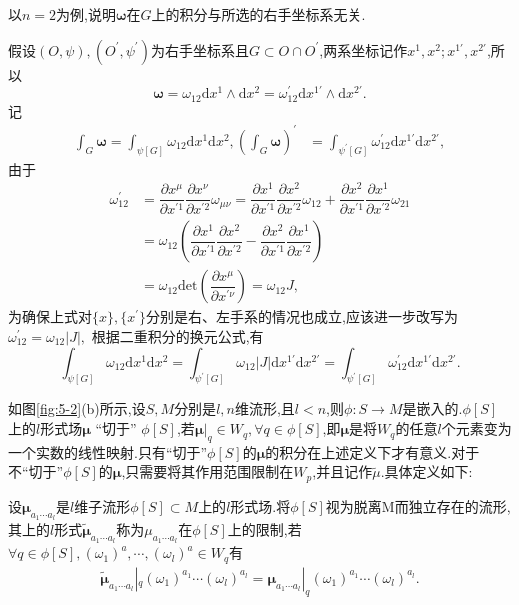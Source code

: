\begin{remark}
以$n=2$为例,说明$\boldsymbol{\omega}$在$G$上的积分与所选的右手坐标系无关.

假设$(O,\psi),(O^\prime,\psi^\prime)$为右手坐标系且$G\subset O\cap O^\prime$,两系坐标记作$x^1,x^2;x^{1\prime},x^{2\prime}$,所以
$$\boldsymbol{\omega}=\omega_{12}\mathrm{d}x^1\wedge \mathrm{d}x^2=\omega_{12}^\prime\mathrm{d}x^{1\prime}\wedge \mathrm{d}x^{2\prime}.
$$
记
$$
\begin{aligned}
\int_G \boldsymbol{\omega}=\int_{\psi{[G]}}\omega_{12} \mathrm{d}x^1\mathrm{d}x^2,\left(\int_G \boldsymbol{\omega}\right)^\prime &=\int_{\psi^\prime{[G]}}\omega_{12}^\prime \mathrm{d}x^{1\prime}\mathrm{d}x^{2\prime},
\end{aligned}
$$
由于
$$
\begin{aligned}
\omega_{12}^\prime&=\dfrac{\partial x^\mu}{\partial x^{\prime 1}}\dfrac{\partial x^\nu}{\partial x^{\prime2}}\omega_{\mu\nu}=\dfrac{\partial x^1}{\partial x^{\prime 1}}\dfrac{\partial x^2}{\partial x^{\prime2}}\omega_{12}+\dfrac{\partial x^2}{\partial x^{\prime 1}}\dfrac{\partial x^1}{\partial x^{\prime2}}\omega_{21}\\
&=\omega_{12}\left(\dfrac{\partial x^1}{\partial x^{\prime 1}}\dfrac{\partial x^2}{\partial x^{\prime2}}-\dfrac{\partial x^2}{\partial x^{\prime 1}}\dfrac{\partial x^1}{\partial x^{\prime2}}\right)\\
&=\omega_{12}\mathrm{det}\left(\dfrac{\partial x^\mu}{\partial x^{\prime\nu}}\right)=\omega_{12}J,
\end{aligned}
$$
为确保上式对$\{x\},\{x^\prime\}$分别是右、左手系的情况也成立,应该进一步改写为$
\omega_{12}^\prime=\omega_{12}|J|,
$
根据二重积分的换元公式,有
$$
\int_{\psi[G]}\omega_{12}\mathrm{d}x^1\mathrm{d}x^2=\int_{\psi^\prime[G]}\omega_{12}|J|\mathrm{d}x^{1\prime}\mathrm{d}x^{2\prime}=\int_{\psi^\prime[G]}\omega_{12}^\prime\mathrm{d}x^{1\prime}\mathrm{d}x^{2\prime}.
$$
\end{remark}

如图\ref{fig:5-2}(b)所示,设$S,M$分别是$l,n$维流形,且$l<n$,则$\phi:S\to M$是嵌入的.$\phi[S]$上的$l$形式场$\boldsymbol{\mu}$ “切于”
$\phi[S]$,若$\boldsymbol{\mu}|_{q}\in W_q,\forall q\in \phi[S]$,即$\boldsymbol{\mu}$是将$W_q$的任意$l$个元素变为一个实数的线性映射.只有“切于”$\phi[S]$的$\boldsymbol{\mu}$的积分在上述定义下才有意义.对于不“切于”$\phi[S]$的$\boldsymbol{\mu}$,只需要将其作用范围限制在$W_p$,并且记作$\tilde{\mu}$.具体定义如下:

设$\boldsymbol{\mu}_{a_1\cdots a_l}$是$l$维子流形$\phi[S]\subset M$上的$l$形式场.将$\phi[S]$视为脱离M而独立存在的流形,其上的$l$形式$\tilde{\boldsymbol{\mu}}_{a_1\cdots a_l}$称为${\mu}_{a_1\cdots a_l}$在$\phi[S]$上的限制,若
$\forall q\in \phi[S],(\omega_1)^a,\cdots,(\omega_l)^a\in W_q$有
\begin{align}
\tilde{\boldsymbol{\mu}}_{a_1\cdots a_l}|_q(\omega_1)^{a_1}\cdots(\omega_l)^{a_l}=\boldsymbol{\mu}_{a_1\cdots a_l}|_q(\omega_1)^{a_1}\cdots(\omega_l)^{a_l}.\end{align}
